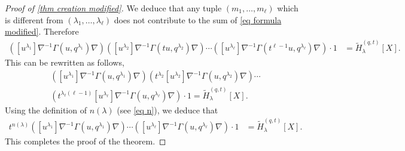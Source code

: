 \documentclass[10pt,a4paper]{amsart}
\newcommand{\tH}{\widetilde{H}^{(q,t)}}
\begin{document}
\begin{proof}[Proof of \cref{thm creation modified}]
We deduce that any tuple $(m_1,\dots,m_\ell)$ which is different from $(\lambda_1,\dots,\lambda_\ell)$ does not contribute to the sum of \cref{eq formula modified}. 
Therefore
\begin{align*}
\left([u^{\lambda_1}]\nabla^{-1}\Gamma(u,q^{\lambda_1})\nabla\right)
\left([u^{\lambda_2}]\nabla^{-1}\Gamma(tu,q^{\lambda_2})\nabla\right)\cdots \left([u^{\lambda_\ell}]\nabla^{-1}\Gamma(t^{\ell-1}u,q^{\lambda_{\ell}})\nabla\right)\cdot 1 & =\tH_\lambda[X].
\end{align*}
This can be rewritten as follows,
\begin{multline*}
\left([u^{\lambda_1}]\nabla^{-1}\Gamma(u,q^{\lambda_1})\nabla\right)
\left(t^{\lambda_2}[u^{\lambda_2}]\nabla^{-1}\Gamma(u,q^{\lambda_2})\nabla\right)\cdots \\
\left(t^{\lambda_\ell(\ell-1)}[u^{\lambda_\ell}]\nabla^{-1}\Gamma(u,q^{\lambda_{\ell}})\nabla\right)\cdot 1 =\tH_\lambda[X].
\end{multline*}
Using the definition of $n(\lambda)$ (see \cref{eq n}), we deduce that
\begin{align*}
t^{n(\lambda)}\left([u^{\lambda_1}]\nabla^{-1}\Gamma(u,q^{\lambda_1})\nabla\right)\cdots \left([u^{\lambda_\ell}]\nabla^{-1}\Gamma(u,q^{\lambda_{\ell}})\nabla\right)\cdot 1 & =\tH_\lambda[X].
\end{align*}
This completes the proof of the theorem.
\end{proof}
\end{document}
